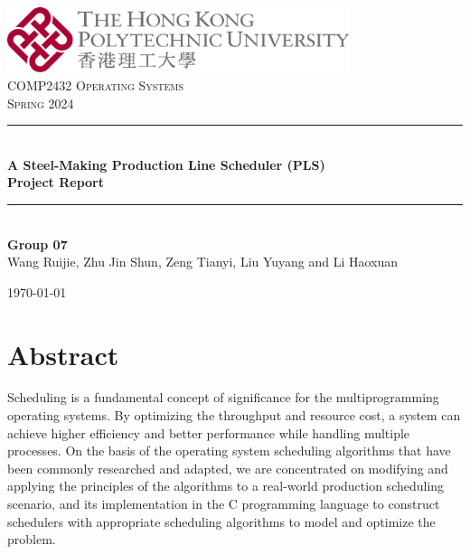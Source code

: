 \documentclass[a4paper, 12pt]{article}
\newcommand{\HRule}{\rule{\linewidth}{0.5mm}}
\begin{document}

\begin{titlepage}
    \begin{center}
      \includegraphics[width=0.75\textwidth]{figure/polyulogo.png}~\\[1cm]
  
      \textsc{\large COMP2432 Operating Systems \\ Spring 2024}\\[3cm]
  
  
      \HRule \\[0.4cm]
      {\large \bfseries A Steel-Making Production Line Scheduler (PLS) \\ Project Report \\[0.4cm]}
      \HRule \\[4cm]
        \textbf{\large Group 07 \\}
      Wang Ruijie, Zhu Jin Shun, Zeng Tianyi, Liu Yuyang and Li Haoxuan \\[8cm]
  
      \vfill
  
      {\today}
  
    \end{center}
\end{titlepage}

\tableofcontents
\newpage

\section{Abstract}

Scheduling is a fundamental concept of significance for the multiprogramming operating systems.
By optimizing the throughput and resource cost, a system can achieve higher efficiency and better performance while handling multiple processes.
On the basis of the operating system scheduling algorithms that have been commonly researched and adapted, we are concentrated on modifying and applying the principles of the
algorithms to a real-world production scheduling scenario, and its implementation in the C programming language to construct schedulers with appropriate scheduling algorithms 
to model and optimize the problem. 
\end{document}
